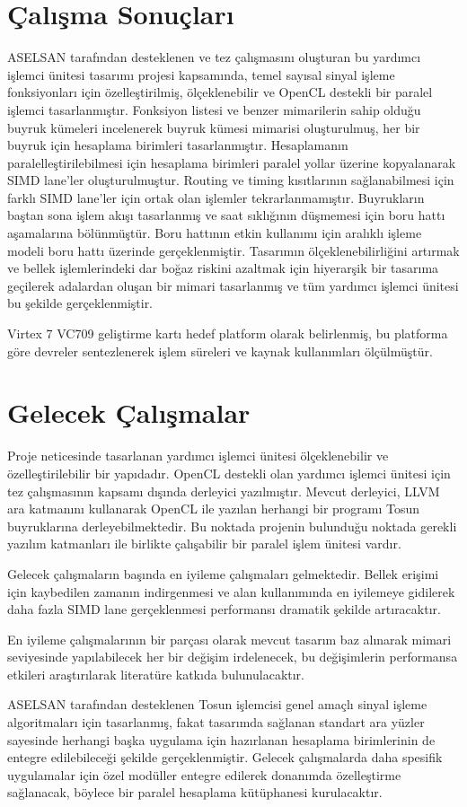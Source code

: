 \section{Çalışma Sonuçları}
ASELSAN tarafından desteklenen ve tez çalışmasını oluşturan bu yardımcı işlemci ünitesi tasarımı projesi kapsamında, temel sayısal sinyal işleme fonksiyonları için özelleştirilmiş, ölçeklenebilir ve OpenCL destekli bir paralel işlemci tasarlanmıştır. Fonksiyon listesi ve benzer mimarilerin sahip olduğu buyruk kümeleri incelenerek buyruk kümesi mimarisi oluşturulmuş, her bir buyruk için hesaplama birimleri tasarlanmıştır. Hesaplamanın paralelleştirilebilmesi için hesaplama birimleri paralel yollar üzerine kopyalanarak SIMD lane'ler oluşturulmuştur. Routing ve timing kısıtlarının sağlanabilmesi için farklı SIMD lane'ler için ortak olan işlemler tekrarlanmamıştır. Buyrukların baştan sona işlem akışı tasarlanmış ve saat sıklığının düşmemesi için boru hattı aşamalarına bölünmüştür. Boru hattının etkin kullanımı için aralıklı işleme modeli boru hattı üzerinde gerçeklenmiştir. Tasarımın ölçeklenebilirliğini artırmak ve bellek işlemlerindeki dar boğaz riskini azaltmak için hiyerarşik bir tasarıma geçilerek adalardan oluşan bir mimari tasarlanmış ve tüm yardımcı işlemci ünitesi bu şekilde gerçeklenmiştir. \par

Virtex 7 VC709 geliştirme kartı hedef platform olarak belirlenmiş, bu platforma göre devreler sentezlenerek işlem süreleri ve kaynak kullanımları ölçülmüştür.

\section{Gelecek Çalışmalar}
Proje neticesinde tasarlanan yardımcı işlemci ünitesi ölçeklenebilir ve özelleştirilebilir bir yapıdadır. OpenCL destekli olan yardımcı işlemci ünitesi için tez çalışmasının kapsamı dışında derleyici yazılmıştır. Mevcut derleyici, LLVM ara katmanını kullanarak OpenCL ile yazılan herhangi bir programı Tosun buyruklarına derleyebilmektedir. Bu noktada projenin bulunduğu noktada gerekli yazılım katmanları ile birlikte çalışabilir bir paralel işlem ünitesi vardır.\par
Gelecek çalışmaların başında en iyileme çalışmaları gelmektedir. Bellek erişimi için kaybedilen zamanın indirgenmesi ve alan kullanımında en iyilemeye gidilerek daha fazla SIMD lane gerçeklenmesi performansı dramatik şekilde artıracaktır.\par En iyileme çalışmalarının bir parçası olarak mevcut tasarım baz alınarak mimari seviyesinde yapılabilecek her bir değişim irdelenecek, bu değişimlerin performansa etkileri araştırılarak literatüre katkıda bulunulacaktır. \par
ASELSAN tarafından desteklenen Tosun işlemcisi genel amaçlı sinyal işleme algoritmaları için tasarlanmış, fakat tasarımda sağlanan standart ara yüzler sayesinde herhangi başka uygulama için hazırlanan hesaplama birimlerinin de entegre edilebileceği şekilde gerçeklenmiştir. Gelecek çalışmalarda daha spesifik uygulamalar için özel modüller entegre edilerek donanımda özelleştirme sağlanacak, böylece bir paralel hesaplama kütüphanesi kurulacaktır.  
